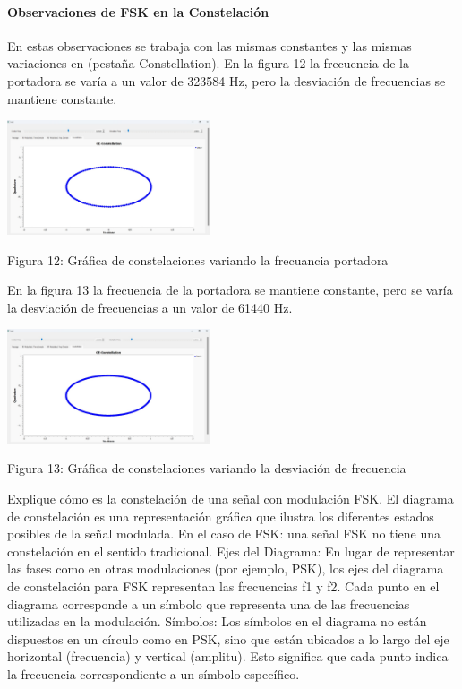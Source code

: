 \documentclass{journal}[IEEEtran, twocolumn]             %
\begin{document}
\begin{multicols}{2}
{\paragraph{Observaciones de FSK en la Constelación}
En estas observaciones se trabaja con las mismas constantes y las mismas variaciones en (pestaña Constellation).
En la figura 12 la frecuencia de la portadora se varía a un valor de 323584 Hz, pero la desviación de frecuencias se mantiene constante.
 \begin{center}
        \includegraphics[width=0.45\textwidth]{figs/F12.png}
        \caption{Figura 12: Gráfica de constelaciones variando la frecuancia portadora}
        \label{fig:12}
    \end{center}
 En la figura 13 la frecuencia de la portadora se mantiene constante, pero se varía la desviación de frecuencias a un valor de 61440 Hz.
 \begin{center}
        \includegraphics[width=0.45\textwidth]{figs/F16.png}
        \caption{Figura 13: Gráfica de constelaciones variando la desviación de frecuencia}
        \label{fig:13}
    \end{center}
Explique cómo es la constelación de una señal con modulación FSK.
El diagrama de constelación es una representación gráfica que ilustra los diferentes estados posibles de la señal modulada. En el caso de FSK:
una señal FSK no tiene una constelación en el sentido tradicional. 
Ejes del Diagrama: En lugar de representar las fases como en otras modulaciones (por ejemplo, PSK), los ejes del diagrama de constelación para FSK representan las frecuencias f1 y f2. Cada punto en el diagrama corresponde a un símbolo que representa una de las frecuencias utilizadas en la modulación.
Símbolos: Los símbolos en el diagrama no están dispuestos en un círculo como en PSK, sino que están ubicados a lo largo del eje horizontal (frecuencia) y vertical (amplitu). Esto significa que cada punto indica la frecuencia correspondiente a un símbolo específico.


}
\end{multicols}
\end{document}
